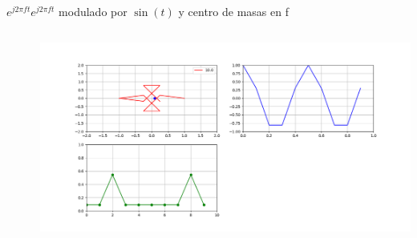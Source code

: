 \begin{frame}{$e^{j2\pi ft}$}{$e^{j2\pi ft}$ modulado por $\sin(t)$ y centro de masas en f}
   \handsonicon
   \begin{columns}[c]
      \hspace{2pt}
      \begin{column}{.3\textwidth}
         
      \end{column}
      \hspace{2pt}
      \vrule
      \hspace{2pt}
      \begin{column}{.3\textwidth}
         
      \end{column}
      \hspace{2pt}
      \vrule
      \hspace{2pt}
      \begin{column}{.4\textwidth}
         \centering\includegraphics[width=1.0\textwidth]{3_clase/euler4}
      \end{column}
      \hspace{2pt}
   \end{columns}
   \vfill
\end{frame}
